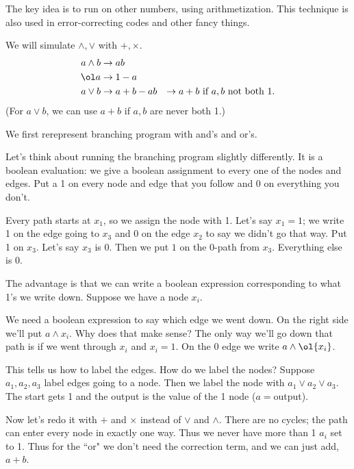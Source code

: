 The key idea is to run on other numbers, using arithmetization. This technique is also used in error-correcting codes and other fancy things. 

We will simulate $\wedge, \vee$ with $+,\times$. 
\begin{align*}
a\wedge b &\to ab\\
\ol a&\to 1-a\\
a\vee b &\to  a+b-ab
&\to a+b\text{ if }a,b\text{ not both }1.
\end{align*}
(For $a\vee b$, we can use $a+b$ if $a,b$ are never both 1.)

We first rerepresent branching program with and's and or's.

Let's think about running the branching program slightly differently. It is a boolean evaluation: we give a boolean assignment to every one of the nodes and edges. Put a 1 on every node and edge that you follow and 0 on everything you don't. %

Every path starts at $x_1$, so we assign the node with 1. Let's say $x_1=1$; we write 1 on the edge going to $x_3$ and 0 on the edge $x_2$ to say we didn't go that way. Put 1 on $x_3$. Let's say $x_3$ is 0. Then we put $1$ on the 0-path from $x_3$. Everything else is 0. 


The advantage is that we can write a boolean expression corresponding to what 1's we write down. Suppose we have a node $x_i$. 

We need a boolean expression to say which edge we went down.
On the right side we'll put $a\wedge x_i$. Why does that make sense? The only way we'll go down that path is if we went through $x_i$ and $x_i=1$. On the 0 edge we write $a\wedge \ol{x_i}$. 


This tells us how to label the edges. How do we label the nodes? Suppose $a_1,a_2,a_3$ label edges going to a node. Then we label the node with $a_1\vee a_2\vee a_3$. The start gets 1 and the output is the value of the 1 node ($a=$output).


Now let's redo it with $+$ and $\times$ instead of $\vee$ and $\wedge$. There are no cycles; the path can enter every node in exactly one way. Thus we never have more than 1 $a_i$ set to 1. Thus for the ``or" we don't need the correction term, and we can just add, $a+b$.

